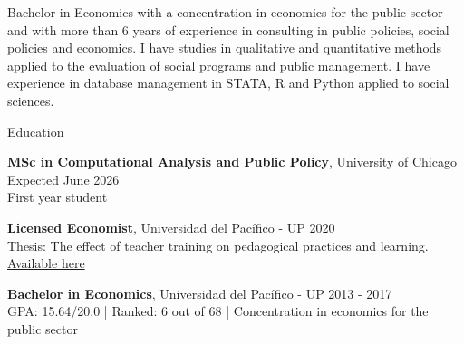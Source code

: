 \documentclass{resume} %
\begin{document}
\item {Bachelor in Economics with a concentration in economics for the public sector and with more than 6 years of experience in consulting in public policies, social policies and economics. I have studies in qualitative and quantitative methods applied to the evaluation of social programs and public management. I have experience in database management in STATA, R and Python applied to social sciences.}


\begin{rSection}{Education}

{\bf MSc in Computational Analysis and Public Policy}, University of Chicago \hfill {Expected June 2026} \\
First year student

{\bf Licensed Economist}, Universidad del Pacífico - UP \hfill {2020} \\
Thesis: The effect of teacher training on pedagogical practices and learning. \href{https://repositorio.up.edu.pe/handle/11354/2653}{Available here}

{\bf Bachelor in Economics}, Universidad del Pacífico - UP \hfill {2013 - 2017}\\
GPA: 15.64/20.0 | Ranked: 6 out of 68 | Concentration in economics for the public sector

\end{rSection}

\end{document}

